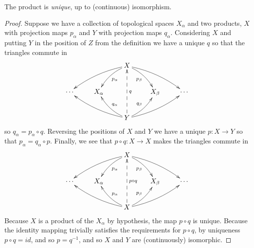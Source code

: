       \begin{claim}
        \label{claim:uniqprod}
        The product is \emph{unique}, up to (continuous) isomorphism.
        \begin{proof}
          Suppose we have a collection of topological spaces $X_\alpha$ and two products, $X$ with projection maps $p_\alpha$ and $Y$ with projection maps $q_\alpha$.
          Considering $X$ and putting $Y$ in the position of $Z$ from the definition we have a unique $q$ so that the triangles commute in
          \begin{displaymath}
            \xymatrix{
              && X \ar@/_/[dll] \ar@/_/[dl]^{p_\alpha} \ar@/^/[dr]_{p_\beta} \ar@/^/[drr] \\
              \cdots & X_\alpha && X_\beta & \cdots\\
              && Y \ar@/^/[ull] \ar@/^/[ul]_{q_\alpha} \ar@{-->}[uu]_q \ar@/_/[ur]^{q_\beta} \ar@/_/[urr]
             }
          \end{displaymath}
          so $q_\alpha=p_\alpha\circ q$.
          Reversing the positions of $X$ and $Y$ we have a unique $p:X\rightarrow Y$ so that $p_\alpha=q_\alpha\circ p$.
          Finally, we see that $p\circ q:X\rightarrow X$ makes the triangles commute in
          \begin{displaymath}
            \xymatrix{
              && X \ar@/_/[dll] \ar@/_/[dl]^{p_\alpha} \ar@/^/[dr]_{p_\beta} \ar@/^/[drr] \\
              \cdots & X_\alpha && X_\beta & \cdots\\
              && X \ar@/^/[ull] \ar@/^/[ul]_{p_\alpha} \ar@{-->}[uu]_{p\circ q} \ar@/_/[ur]^{p_\beta} \ar@/_/[urr]
             }
          \end{displaymath}
          Because $X$ is a product of the $X_\alpha$ by hypothesis, the map $p\circ q$ is unique.
          Because the identity mapping trivially satisfies the requirements for $p\circ q$, by uniqueness $p\circ q=id$, and so $p=q^{-1}$, and so $X$ and $Y$ are (continuously) isomorphic.
        \end{proof}
      \end{claim}

